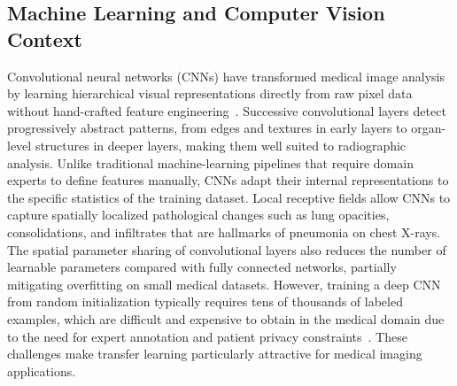 \documentclass[preprint,12pt]{elsarticle}
\begin{document}
\subsection{Machine Learning and Computer Vision Context}
Convolutional neural networks (CNNs) have transformed medical image
analysis by learning hierarchical visual representations directly from
raw pixel data without hand-crafted feature engineering~\cite{krizhevsky2012}.
Successive convolutional layers detect progressively abstract patterns,
from edges and textures in early layers to organ-level structures in
deeper layers, making them well suited to radiographic analysis.
Unlike traditional machine-learning pipelines that require domain
experts to define features manually, CNNs adapt their internal
representations to the specific statistics of the training dataset.
Local receptive fields allow CNNs to capture spatially localized
pathological changes such as lung opacities, consolidations, and
infiltrates that are hallmarks of pneumonia on chest X-rays.
The spatial parameter sharing of convolutional layers also reduces the
number of learnable parameters compared with fully connected networks,
partially mitigating overfitting on small medical datasets.
However, training a deep CNN from random initialization typically
requires tens of thousands of labeled examples, which are difficult and
expensive to obtain in the medical domain due to the need for expert
annotation and patient privacy constraints~\cite{huang2017densenet}.
These challenges make transfer learning particularly attractive for
medical imaging applications.

\end{document}
